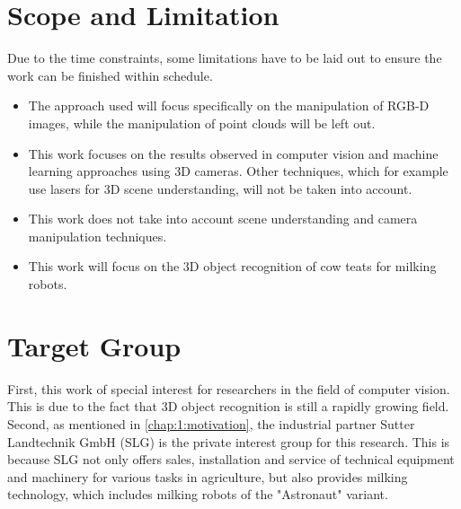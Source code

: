 \section{Scope and Limitation}\label{chap:1:scope}
Due to the time constraints, some limitations have to be laid out to ensure the work can be finished within schedule.
\begin{itemize}
    \item The approach used will focus specifically on the manipulation of RGB-D images, while the manipulation of point clouds will be left out.
    \item This work focuses on the results observed in computer vision and machine learning approaches using 3D cameras. Other techniques, which for example use lasers for 3D scene understanding, will not be taken into account.
    \item This work does not take into account scene understanding and camera manipulation techniques.
    \item This work will focus on the 3D object recognition of cow teats for milking robots.
\end{itemize}
\section{Target Group}\label{chap:1:target-group}
First, this work of special interest for researchers in the field of computer vision. This is due to the fact that 3D object recognition is still a rapidly growing field.  Second, as mentioned in \ref{chap:1:motivation}, the industrial partner Sutter Landtechnik GmbH (SLG) is the private interest group for this research.  This is because SLG not only offers sales, installation and service of technical equipment and machinery for various tasks in agriculture, but also
provides milking technology, which includes milking robots of the "Astronaut" variant\cite{2021lely-a5}.




